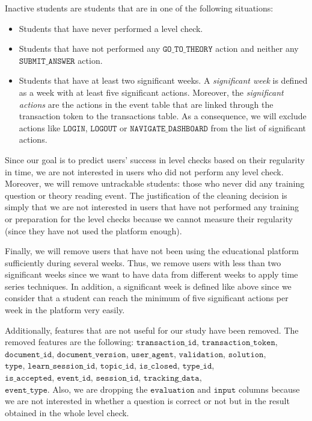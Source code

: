 \documentclass[sigplan,screen]{acmart}
\begin{document}
Inactive students are students that are in one of the following situations:
\begin{itemize}
\item Students that have never performed a level check.
\item Students that have not performed any $\texttt{GO\_TO\_THEORY}$ action and neither any $\texttt{SUBMIT\_ANSWER}$ action.
\item Students that have at least two significant weeks. A \emph{significant week} is defined as a week with at least five significant actions. Moreover, the \emph{significant actions} are the actions in the event table that are linked through the transaction token to the transactions table. As a consequence, we will exclude actions like $\texttt{LOGIN}$, $\texttt{LOGOUT}$ or $\texttt{NAVIGATE\_DASHBOARD}$ from the list of significant actions.
\end{itemize}
Since our goal is to predict users' success in level checks based on their regularity in time, we are not interested in users who did not perform any level check. Moreover, we will remove untrackable students: those who never did any training question or theory reading event. The justification of the cleaning decision is simply that we are not interested in users that have not performed any training or preparation for the level checks because we cannot measure their regularity (since they have not used the platform enough).

Finally, we will remove users that have not been using the educational platform sufficiently during several weeks. Thus, we remove users with less than two significant weeks since we want to have data from different weeks to apply time series techniques. In addition, a significant week is defined like above since we consider that a student can reach the minimum of five significant actions per week in the platform very easily.

Additionally, features that are not useful for our study have been removed. The removed features are the following: $\texttt{transaction\_id}$, $\texttt{transaction\_token}$, $\texttt{document\_id}$, $\texttt{document\_version}$, $\texttt{user\_agent}$, $\texttt{validation}$, $\texttt{solution}$, \\ $\texttt{type}$, $\texttt{learn\_session\_id}$, $\texttt{topic\_id}$, $\texttt{is\_closed}$, $\texttt{type\_id}$, \\ $\texttt{is\_accepted}$, $\texttt{event\_id}$, $\texttt{session\_id}$, $\texttt{tracking\_data}$, \\ $\texttt{event\_type}$. Also, we are dropping the $\texttt{evaluation}$ and $\texttt{input}$ columns because we are not interested in whether a question is correct or not but in the result obtained in the whole level check.
\end{document}
